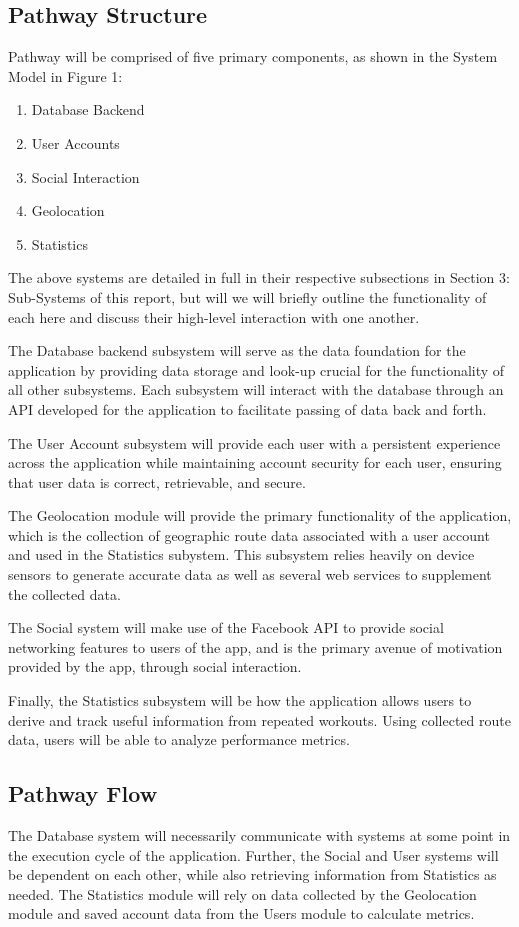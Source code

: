 \documentclass{article}
\begin{document}
\subsection{Pathway Structure}

Pathway will be comprised of five primary components, as shown in the System Model in Figure 1:
\begin{enumerate}
    \item Database Backend
    \item User Accounts
    \item Social Interaction
    \item Geolocation
    \item Statistics
\end{enumerate}
The above systems are detailed in full in their respective subsections in Section 3: Sub-Systems of this report, but will we will briefly outline the functionality of each here and discuss their high-level interaction with one another.

The Database backend subsystem will serve as the data foundation for the application by providing data storage and look-up crucial for the functionality of all other subsystems. Each subsystem will interact with the database through an API developed for the application to facilitate passing of data back and forth.

The User Account subsystem will provide each user with a persistent experience across the application while maintaining account security for each user, ensuring that user data is correct, retrievable, and secure.

The Geolocation module will provide the primary functionality of the application, which is the collection of geographic route data associated with a user account and used in the Statistics subystem. This subsystem relies heavily on device sensors to generate accurate data as well as several web services to supplement the collected data.

The Social system will make use of the Facebook API to provide social networking features to users of the app, and is the primary avenue of motivation provided by the app, through social interaction.

Finally, the Statistics subsystem will be how the application allows users to derive and track useful information from repeated workouts. Using collected route data, users will be able to analyze performance metrics.

\subsection{Pathway Flow}
The Database system will necessarily communicate with systems at some point in the execution cycle of the application. Further, the Social and User systems will be dependent on each other, while also retrieving information from Statistics as needed.
The Statistics module will rely on data collected by the Geolocation module and saved account data from the Users module to calculate metrics.
\end{document}
